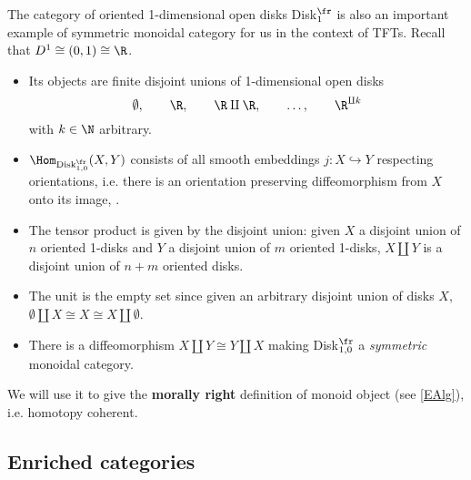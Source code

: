 \begin{ex}\label{CatOfDisks}
    The category of oriented 1-dimensional open disks Disk$^{\fr}_{1}$ is also an important example of symmetric monoidal category for us in the context of TFTs. Recall that $D^1\cong (0,1)\cong\R$. 
    \begin{itemize}
        \item Its objects are finite disjoint unions of 1-dimensional open disks $$\emptyset,\qquad\R,\qquad\R\amalg\R,\qquad\dots,\qquad\R^{\amalg k}$$ with $k\in\N$ arbitrary.
        \item $\Hom_{\text{Disk}^{\fr}_{1,0}}(X,Y)$ consists of all smooth embeddings $j:X\hookrightarrow Y$ respecting orientations, i.e. there is an orientation preserving diffeomorphism from $X$ onto its image, .
        \item The tensor product is given by the disjoint union: given $X$ a disjoint union of $n$ oriented 1-disks and $Y$ a disjoint union of $m$ oriented 1-disks, $X\amalg Y$ is a disjoint union of $n+m$ oriented disks.
        \item The unit is the empty set since given an arbitrary disjoint union of disks $X$, $\emptyset\amalg X\cong X\cong X\amalg\emptyset$.
        \item There is a diffeomorphism $X\amalg Y\cong Y\amalg X$ making Disk$^{\fr}_{1,0}$ a \emph{symmetric} monoidal category.
    \end{itemize}  
    We will use it to give the \textbf{morally right} definition of monoid object (see \ref{EAlg}), i.e. 
    homotopy coherent.
\end{ex}
\subsection{Enriched categories \extra} %
\label{sub:Enriched categories}

